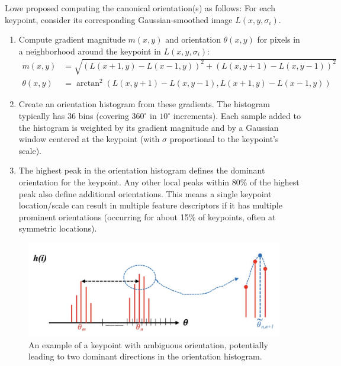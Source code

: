 Lowe proposed computing the canonical orientation(s) as follows:
For each keypoint, consider its corresponding Gaussian-smoothed image $L(x,y,\sigma_i)$.
\begin{enumerate}
  \item Compute gradient magnitude $m(x,y)$ and orientation $\theta(x,y)$ for pixels in a neighborhood around the keypoint in $L(x,y,\sigma_i)$:
    \begin{align*}
        m(x,y) &= \sqrt{(L(x+1,y)-L(x-1,y))^2 + (L(x,y+1) - L(x,y-1))^2} \\
        \theta(x,y) &= \arctan^2(L(x,y+1)-L(x,y-1), L(x+1,y)-L(x-1,y))
    \end{align*}
  \item Create an orientation histogram from these gradients. The histogram typically has 36 bins (covering $360^\circ$ in $10^\circ$ increments). Each sample added to the histogram is weighted by its gradient magnitude and by a Gaussian window centered at the keypoint (with $\sigma$ proportional to the keypoint's scale).
  \item The highest peak in the orientation histogram defines the dominant orientation for the keypoint. Any other local peaks within 80\% of the highest peak also define additional orientations. This means a single keypoint location/scale can result in multiple feature descriptors if it has multiple prominent orientations (occurring for about 15\% of keypoints, often at symmetric locations).
\end{enumerate}

\begin{figure}[htbp]
  \centering
  \includegraphics[width=0.7\linewidth]{./img/ambiguous_keypoint.jpg}
  \caption{An example of a keypoint with ambiguous orientation, potentially leading to two dominant directions in the orientation histogram.}
  \label{fig:ambiguous_keypoints}
\end{figure}

